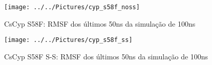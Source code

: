 \begin{figure}[h!]
	\centering
	\texttt{[image: ../../Pictures/cyp\_s58f\_noss]}
	\caption{CsCyp S58F: RMSF dos últimos 50ns da simulação de 100ns}
\end{figure}

\begin{figure}[h!]
	\centering
	\texttt{[image: ../../Pictures/cyp\_s58f\_ss]}
	\caption{CsCyp S58F S-S: RMSF dos últimos 50ns da simulação de 100ns}
\end{figure}


  
 